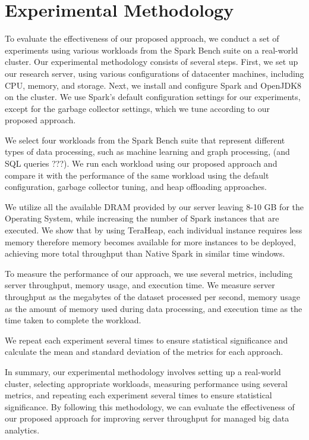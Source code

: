 \section{Experimental Methodology}
\label{sec:method}

To evaluate the effectiveness of our proposed approach, we conduct a
set of experiments using various workloads from the Spark Bench suite
on a real-world cluster. Our experimental methodology consists of
several steps. First, we set up our research server, using various
configurations of datacenter machines, including CPU, memory, and
storage. Next, we install and configure Spark and OpenJDK8 on the
cluster. We use Spark's default configuration settings for our
experiments, except for the garbage collector settings, which we tune
according to our proposed approach.

We select four workloads from the Spark Bench suite that represent
different types of data processing, such as machine learning and graph
processing, (and SQL queries ???). We run each workload using our
proposed approach and compare it with the performance of the same
workload using the default configuration, garbage collector tuning,
and heap offloading approaches.

We utilize all the available DRAM provided by our server leaving 8-10
GB for the Operating System, while increasing the number of Spark
instances that are executed. We show that by using TeraHeap, each
individual instance requires less memory therefore memory becomes
available for more instances to be deployed, achieving more total
throughput than Native Spark in similar time windows.

To measure the performance of our approach, we use several metrics,
including server throughput, memory usage, and execution time. We
measure server throughput as the megabytes of the dataset processed
per second, memory usage as the amount of memory used during data
processing, and execution time as the time taken to complete the
workload.

We repeat each experiment several times to ensure statistical
significance and calculate the mean and standard deviation of the
metrics for each approach.

In summary, our experimental methodology involves setting up a
real-world cluster, selecting appropriate workloads, measuring
performance using several metrics, and repeating each experiment
several times to ensure statistical significance. By following this
methodology, we can evaluate the effectiveness of our proposed
approach for improving server throughput for managed big data
analytics.

